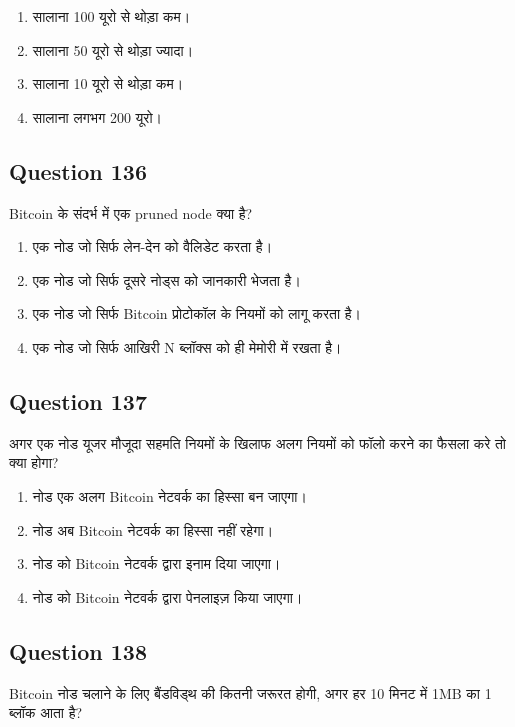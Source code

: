 \documentclass[12pt,a4paper]{article}
\begin{document}
\begin{enumerate}[label=\Alph*., leftmargin=*]
\item सालाना 100 यूरो से थोड़ा कम।
\item सालाना 50 यूरो से थोड़ा ज्यादा।
\item सालाना 10 यूरो से थोड़ा कम।
\item सालाना लगभग 200 यूरो।
\end{enumerate}

\bigskip


\subsection*{Question 136}
Bitcoin के संदर्भ में एक pruned node क्या है?

\begin{enumerate}[label=\Alph*., leftmargin=*]
\item एक नोड जो सिर्फ लेन-देन को वैलिडेट करता है।
\item एक नोड जो सिर्फ दूसरे नोड्स को जानकारी भेजता है।
\item एक नोड जो सिर्फ Bitcoin प्रोटोकॉल के नियमों को लागू करता है।
\item एक नोड जो सिर्फ आखिरी N ब्लॉक्स को ही मेमोरी में रखता है।
\end{enumerate}

\bigskip


\subsection*{Question 137}
अगर एक नोड यूजर मौजूदा सहमति नियमों के खिलाफ अलग नियमों को फॉलो करने का फैसला करे तो क्या होगा?

\begin{enumerate}[label=\Alph*., leftmargin=*]
\item नोड एक अलग Bitcoin नेटवर्क का हिस्सा बन जाएगा।
\item नोड अब Bitcoin नेटवर्क का हिस्सा नहीं रहेगा।
\item नोड को Bitcoin नेटवर्क द्वारा इनाम दिया जाएगा।
\item नोड को Bitcoin नेटवर्क द्वारा पेनलाइज़ किया जाएगा।
\end{enumerate}

\bigskip


\subsection*{Question 138}
Bitcoin नोड चलाने के लिए बैंडविड्थ की कितनी जरूरत होगी, अगर हर 10 मिनट में 1MB का 1 ब्लॉक आता है?
\end{document}
